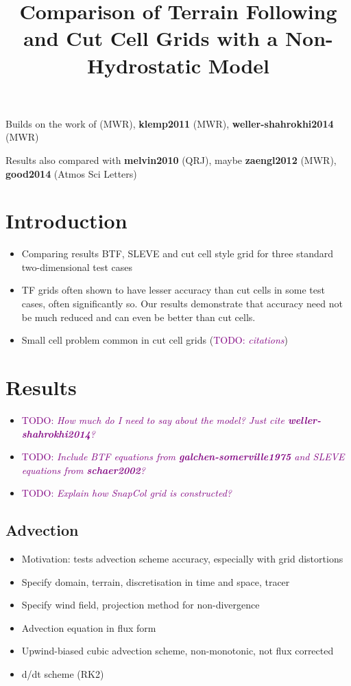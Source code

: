 \documentclass{ametsoc}
\title{Comparison of Terrain Following and Cut Cell Grids with a Non-Hydrostatic Model}
\affiliation{}
\begin{document}
\newcommand{\TODO}[1]{\textcolor{purple}{TODO: \emph{#1}}}
\newcommand{\textcite}[1]{\textbf{#1}}

\maketitle

Builds on the work of \citet{schaer2002} (MWR), \textcite{klemp2011} (MWR), \textcite{weller-shahrokhi2014} (MWR)

Results also compared with \textcite{melvin2010} (QRJ), maybe \textcite{zaengl2012} (MWR), \textcite{good2014} (Atmos Sci Letters)

\section{Introduction}

\begin{itemize}
	\item Comparing results BTF, SLEVE and cut cell style grid for three standard two-dimensional test cases
	\item TF grids often shown to have lesser accuracy than cut cells in some test cases, often significantly so.  Our results demonstrate that accuracy need not be much reduced and can even be better than cut cells.
	\item Small cell problem common in cut cell grids (\TODO{citations})
\end{itemize}

\section{Results}
\begin{itemize}
	\item \TODO{How much do I need to say about the model?  Just cite \textcite{weller-shahrokhi2014}?}
	\item \TODO{Include BTF equations from \textcite{galchen-somerville1975} and SLEVE equations from \textcite{schaer2002}?}
	\item \TODO{Explain how SnapCol grid is constructed?}
\end{itemize}

\subsection{Advection}
\begin{itemize}
	\item Motivation: tests advection scheme accuracy, especially with grid distortions
	\item Specify domain, terrain, discretisation in time and space, tracer
	\item Specify wind field, projection method for non-divergence
	\item Advection equation in flux form
	\item Upwind-biased cubic advection scheme, non-monotonic, not flux corrected
	\item d/dt scheme (RK2)
\end{itemize}
\end{document}
